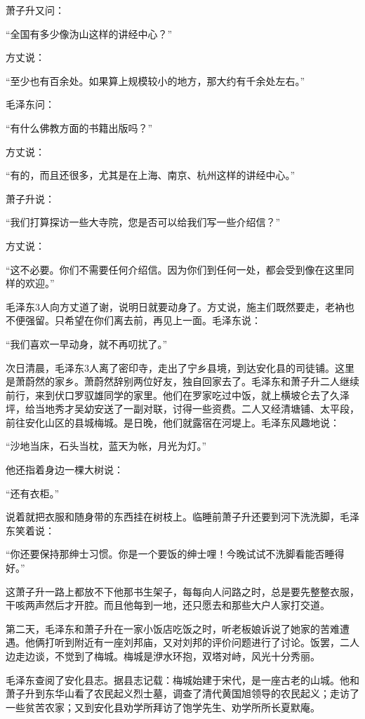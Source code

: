 \documentclass[../../dazhuan.tex]{subfiles}
\begin{document}
萧子升又问：

“全国有多少像沩山这样的讲经中心？”

方丈说：

“至少也有百余处。如果算上规模较小的地方，那大约有千余处左右。”

毛泽东问：

“有什么佛教方面的书籍出版吗？”

方丈说：

“有的，而且还很多，尤其是在上海、南京、杭州这样的讲经中心。”

萧子升说：

“我们打算探访一些大寺院，您是否可以给我们写一些介绍信？”

方丈说：

“这不必要。你们不需要任何介绍信。因为你们到任何一处，都会受到像在这里同样的欢迎。”

毛泽东3人向方丈道了谢，说明日就要动身了。方丈说，施主们既然要走，老衲也不便强留。只希望在你们离去前，再见上一面。毛泽东说：

“我们喜欢一早动身，就不再叨扰了。”

次日清晨，毛泽东3人离了密印寺，走出了宁乡县境，到达安化县的司徒铺。这里是萧蔚然的家乡。萧蔚然辞别两位好友，独自回家去了。毛泽东和萧子升二人继续前行，来到伏口罗驭雄同学的家里。他们在罗家吃过中饭，就上横坡仑去了久泽坪，给当地秀才吴幼安送了一副对联，讨得一些资费。二人又经清塘铺、太平段，前往安化山区的县城梅城。是日晚，他们就露宿在河堤上。毛泽东风趣地说：

“沙地当床，石头当枕，蓝天为帐，月光为灯。”

他还指着身边一棵大树说：

“还有衣柜。”

说着就把衣服和随身带的东西挂在树枝上。临睡前萧子升还要到河下洗洗脚，毛泽东笑着说：

“你还要保持那绅士习惯。你是一个要饭的绅士哩！今晚试试不洗脚看能否睡得好。”

这萧子升一路上都放不下他那书生架子，每每向人问路之时，总是要先整整衣服，干咳两声然后才开腔。而且他每到一地，还只愿去和那些大户人家打交道。

第二天，毛泽东和萧子升在一家小饭店吃饭之时，听老板娘诉说了她家的苦难遭遇。他俩打听到附近有一座刘邦庙，又对刘邦的评价问题进行了讨论。饭罢，二人边走边谈，不觉到了梅城。梅城是洢水环抱，双塔对峙，风光十分秀丽。

毛泽东查阅了安化县志。据县志记载：梅城始建于宋代，是一座古老的山城。他和萧子升到东华山看了农民起义烈士墓，调查了清代黄国旭领导的农民起义；走访了一些贫苦农家；又到安化县劝学所拜访了饱学先生、劝学所所长夏默庵。
\end{document}
